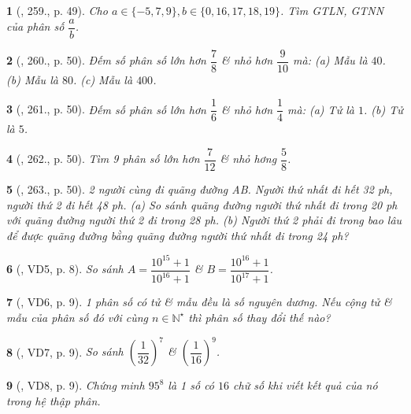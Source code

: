 \documentclass{article}
\newtheorem{baitoan}{}
\begin{document}
\begin{baitoan}[\cite{Tuyen_Toan_6}, 259., p. 49]
	Cho $a\in\{-5,7,9\},b\in\{0,16,17,18,19\}$. Tìm {\rm GTLN, GTNN} của phân số $\dfrac{a}{b}$.
\end{baitoan}

\begin{baitoan}[\cite{Tuyen_Toan_6}, 260., p. 50]
	Đếm số phân số lớn hơn $\dfrac{7}{8}$ \& nhỏ hơn $\dfrac{9}{10}$ mà: (a) Mẫu là $40$. (b) Mẫu là $80$. (c) Mẫu là $400$.
\end{baitoan}

\begin{baitoan}[\cite{Tuyen_Toan_6}, 261., p. 50]
	Đếm số phân số lớn hơn $\dfrac{1}{6}$ \& nhỏ hơn $\dfrac{1}{4}$ mà: (a) Tử là $1$. (b) Tử là $5$.
\end{baitoan}

\begin{baitoan}[\cite{Tuyen_Toan_6}, 262., p. 50]
	Tìm 9 phân số lớn hơn $\dfrac{7}{12}$ \& nhỏ hơng $\dfrac{5}{8}$.
\end{baitoan}

\begin{baitoan}[\cite{Tuyen_Toan_6}, 263., p. 50]
	2 người cùng đi quãng đường AB. Người thứ nhất đi hết {\rm32 ph}, người thứ 2 đi hết {\rm48 ph}. (a) So sánh quãng đường người thứ nhất đi trong {\rm20 ph} với quãng đường người thứ 2 đi trong {\rm28 ph}. (b) Người thứ 2 phải đi trong bao lâu để được quãng đường bằng quãng đường người thứ nhất đi trong {\rm24 ph}?
\end{baitoan}

\begin{baitoan}[\cite{Binh_Toan_6_tap_2}, VD5, p. 8]
	So sánh $A = \dfrac{10^{15} + 1}{10^{16} + 1}$ \& $B = \dfrac{10^{16} + 1}{10^{17} + 1}$.
\end{baitoan}

\begin{baitoan}[\cite{Binh_Toan_6_tap_2}, VD6, p. 9]
	1 phân số có tử \& mẫu đều là số nguyên dương. Nếu cộng tử \& mẫu của phân số đó với cùng $n\in\mathbb{N}^\star$ thì phân số thay đổi thế nào?
\end{baitoan}

\begin{baitoan}[\cite{Binh_Toan_6_tap_2}, VD7, p. 9]
	So sánh $\left(\dfrac{1}{32}\right)^7$ \& $\left(\dfrac{1}{16}\right)^9$.
\end{baitoan}

\begin{baitoan}[\cite{Binh_Toan_6_tap_2}, VD8, p. 9]
	Chứng minh $95^8$ là 1 số có $16$ chữ số khi viết kết quả của nó trong hệ thập phân.
\end{baitoan}
\end{document}

